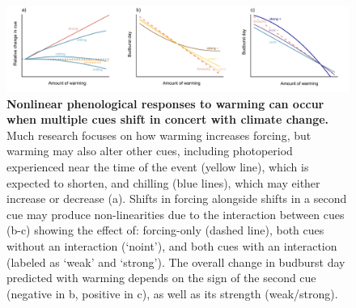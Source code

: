 \documentclass[11pt,letter]{article}
\begin{document}
\begin{figure}
\centering
\includegraphics[width=1.1\textwidth]{..//..//analyses/limitingcues/figures/intxnsims2021photoaltwithchill_3panels_sm_coltweak.pdf} 
\caption{{\bf Nonlinear phenological responses to warming can occur when multiple cues shift in concert with climate change.} Much research focuses on how warming increases forcing, but warming may also alter other cues, including photoperiod experienced near the time of the event (yellow line), which is expected to shorten, and chilling (blue lines), which may either increase or decrease (a). Shifts in forcing alongside shifts in a second cue may produce non-linearities due to the interaction between cues (b-c) showing the effect of: forcing-only (dashed line), both cues without an interaction (`noint'), and both cues with an interaction (labeled as `weak' and `strong'). The overall change in budburst day predicted with warming depends on the sign of the second cue (negative in b, positive in c), as well as its strength (weak/strong).}
  \label{fig:intxncues}
\end{figure}
\end{document}

